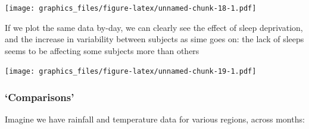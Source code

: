 \documentclass[]{article}
\newenvironment{Shaded}{\begin{snugshade}}{\end{snugshade}}
\newcommand{\DataTypeTok}[1]{\textcolor[rgb]{0.13,0.29,0.53}{#1}}
\newcommand{\KeywordTok}[1]{\textcolor[rgb]{0.13,0.29,0.53}{\textbf{#1}}}
\newcommand{\NormalTok}[1]{#1}
\newcommand{\OperatorTok}[1]{\textcolor[rgb]{0.81,0.36,0.00}{\textbf{#1}}}
\newcommand{\StringTok}[1]{\textcolor[rgb]{0.31,0.60,0.02}{#1}}
\begin{document}
\texttt{[image: graphics\_files/figure-latex/unnamed-chunk-18-1.pdf]}

If we plot the same data by-day, we can clearly see the effect of sleep
deprivation, and the increase in variability between subjects as sime goes on:
the lack of sleeps seems to be affecting some subjects more than others

\begin{Shaded}
\end{Shaded}

\texttt{[image: graphics\_files/figure-latex/unnamed-chunk-19-1.pdf]}

\hypertarget{comparisons}{%
\subsubsection*{`Comparisons'}\label{comparisons}}

Imagine we have rainfall and temperature data for various regions, across
months:

\begin{Shaded}
\end{Shaded}
\end{document}
